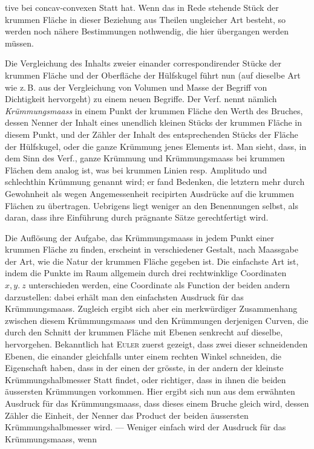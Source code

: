 %
tive bei concav-convexen Statt hat. Wenn das in Rede stehende Stück der krummen Fläche in dieser Beziehung aus Theilen ungleicher Art besteht, so werden noch nähere Bestimmungen nothwendig, die hier übergangen werden müssen.

Die Vergleichung des Inhalts zweier einander correspondirender Stücke der krummen Fläche und der Oberfläche der Hülfskugel führt nun (auf dieselbe Art wie z.\,B. aus der Vergleichung von Volumen und Masse der Begriff von Dichtigkeit hervorgeht) zu einem neuen Begriffe. Der Verf. nennt nämlich \textit{Krümmungsmaass} in einem Punkt der krummen Fläche den Werth des Bruches, dessen Nenner der Inhalt eines unendlich kleinen Stücks der krummen Fläche in diesem Punkt, und der Zähler der Inhalt des entsprechenden Stücks der Fläche der Hülfskugel, oder die ganze Krümmung jenes Elements ist. Man sieht, dass, in dem Sinn des Verf., ganze Krümmung und Krümmungsmaass bei krummen Flächen dem analog ist, was bei krummen Linien resp. Amplitudo und schlechthin Krümmung genannt wird; er fand Bedenken, die letztern mehr durch Gewohnheit als wegen Angemessenheit recipirten Ausdrücke auf die krummen Flächen zu übertragen. Uebrigens liegt weniger an den Benennungen selbst, als daran, dass ihre Einführung durch prägnante Sätze gerechtfertigt wird.

Die Auflösung der Aufgabe, das Krümmungsmaass in jedem Punkt einer krummen Fläche zu finden, erscheint in verschiedener Gestalt, nach Maassgabe der Art, wie die Natur der krummen Fläche gegeben ist. Die einfachste Art ist, indem die Punkte im Raum allgemein durch drei rechtwinklige Coordinaten \(x,y.\ z\) unterschieden werden, eine Coordinate als Function der beiden andern darzustellen: dabei erhält man den einfachsten Ausdruck für das Krümmungsmaass. Zugleich ergibt sich aber ein merkwürdiger Zusammenhang zwischen diesem Krümmungsmaass und den Krümmungen derjenigen Curven, die durch den Schnitt der krummen Fläche mit Ebenen senkrecht auf dieselbe, hervorgehen. Bekanntlich hat \textsc{Euler} zuerst gezeigt, dass zwei dieser schneidenden Ebenen, die einander gleichfalls unter einem rechten Winkel schneiden, die Eigenschaft haben, dass in der einen der grösste, in der andern der kleinste Krümmungshalbmesser Statt findet, oder richtiger, dass in ihnen die beiden äussersten Krümmungen vorkommen. Hier ergibt sich nun aus dem erwähnten Ausdruck für das Krümmungsmaass, dass dieses einem Bruche gleich wird, dessen Zähler die Einheit, der Nenner das Product der beiden äussersten Krümmungshalbmesser wird. --- Weniger einfach wird der Ausdruck für das Krümmungsmaass, wenn
